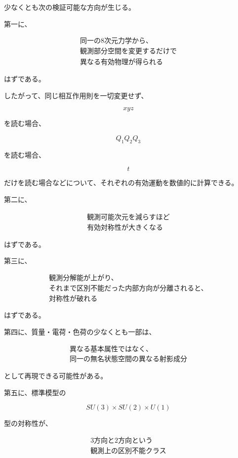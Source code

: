 \documentclass[
  a4paper,
]{ltjsarticle}
\begin{document}
少なくとも次の検証可能な方向が生じる。

第一に、

\[
\boxed{
\begin{array}{c}
\text{同一の8次元力学から、}\\
\text{観測部分空間を変更するだけで}\\
\text{異なる有効物理が得られる}
\end{array}
}
\]

はずである。

したがって、同じ相互作用則を一切変更せず、

\[
xyz
\]

を読む場合、

\[
Q_1Q_2Q_3
\]

を読む場合、

\[
t
\]

だけを読む場合などについて、それぞれの有効運動を数値的に計算できる。

第二に、

\[
\boxed{
\begin{array}{c}
\text{観測可能次元を減らすほど}\\
\text{有効対称性が大きくなる}
\end{array}
}
\]

はずである。

第三に、

\[
\boxed{
\begin{array}{c}
\text{観測分解能が上がり、}\\
\text{それまで区別不能だった内部方向が分離されると、}\\
\text{対称性が破れる}
\end{array}
}
\]

はずである。

第四に、質量・電荷・色荷の少なくとも一部は、

\[
\boxed{
\begin{array}{c}
\text{異なる基本属性ではなく、}\\
\text{同一の無名状態空間の異なる射影成分}
\end{array}
}
\]

として再現できる可能性がある。

第五に、標準模型の

\[
SU(3)\times SU(2)\times U(1)
\]

型の対称性が、

\[
\boxed{
\begin{array}{c}
\text{3方向と2方向という}\\
\text{観測上の区別不能クラス}
\end{array}
}
\]
\end{document}
